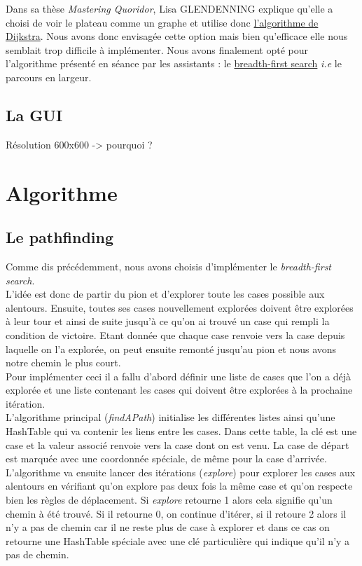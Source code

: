\documentclass[a4paper, 12pt]{article}
\begin{document}
Dans sa thèse \textit{Mastering Quoridor}, Lisa GLENDENNING explique qu'elle a choisi de voir le plateau comme un graphe et utilise donc \href{https://en.wikipedia.org/wiki/Dijkstra_algorithm}{l'algorithme de Dijkstra}. Nous avons donc envisagée cette option mais bien qu'efficace elle nous semblait trop difficile à implémenter. Nous avons finalement opté pour l'algorithme présenté en séance par les assistants : le \href{https://en.wikipedia.org/wiki/Breadth-first_search}{breadth-first search} \textit{i.e} le parcours en largeur.

\subsection{La GUI}
Résolution 600x600 -> pourquoi ?

\section{Algorithme}

\subsection{Le pathfinding}
Comme dis précédemment, nous avons choisis d'implémenter le \textit{breadth-first search}. \\

L'idée est donc de partir du pion et d'explorer toute les cases possible aux alentours. Ensuite, toutes ses cases nouvellement explorées doivent être explorées à leur tour et ainsi de suite jusqu'à ce qu'on ai trouvé un case qui rempli la condition de victoire. Etant donnée que chaque case renvoie vers la case depuis laquelle on l'a explorée, on peut ensuite remonté jusqu'au pion et nous avons notre chemin le plus court. \\

Pour implémenter ceci il a fallu d'abord définir une liste de cases que l'on a déjà explorée et une liste contenant les cases qui doivent être explorées à la prochaine itération. \\

L'algorithme principal (\textit{findAPath}) initialise les différentes listes ainsi qu'une HashTable qui va contenir les liens entre les cases. Dans cette table, la clé est une case et la valeur associé renvoie vers la case dont on est venu. La case de départ est marquée avec une coordonnée spéciale, de même pour la case d'arrivée. L'algorithme va ensuite lancer des itérations (\textit{explore}) pour explorer les cases aux alentours en vérifiant qu'on explore pas deux fois la même case et qu'on respecte bien les règles de déplacement. Si \textit{explore} retourne 1 alors cela signifie qu'un chemin à été trouvé. Si il retourne 0, on continue d'itérer, si il retoure 2 alors il n'y a pas de chemin car il ne reste plus de case à explorer et dans ce cas on retourne une HashTable spéciale avec une clé particulière qui indique qu'il n'y a pas de chemin.\\
\end{document}
